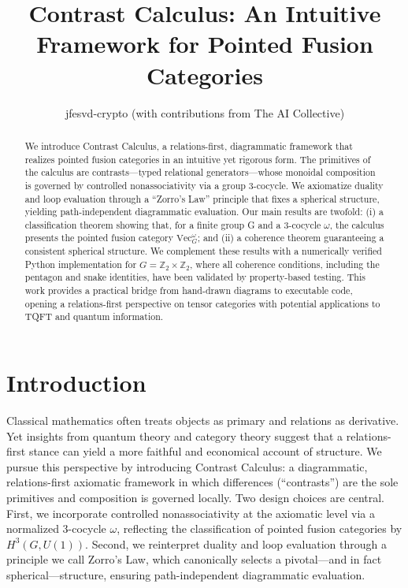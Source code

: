 \documentclass[11pt]{article}
\title{Contrast Calculus: An Intuitive Framework for Pointed Fusion Categories}
\author{jfesvd-crypto (with contributions from The AI Collective)}
\date{}
\theoremstyle{definition}
\theoremstyle{remark}
\begin{document}
\maketitle

\begin{abstract}
We introduce Contrast Calculus, a relations-first, diagrammatic framework that realizes pointed fusion categories in an intuitive yet rigorous form. The primitives of the calculus are contrasts—typed relational generators—whose monoidal composition is governed by controlled nonassociativity via a group 3-cocycle. We axiomatize duality and loop evaluation through a “Zorro’s Law” principle that fixes a spherical structure, yielding path-independent diagrammatic evaluation. Our main results are twofold: (i) a classification theorem showing that, for a finite group G and a 3-cocycle $\omega$, the calculus presents the pointed fusion category $\mathrm{Vec}_G^\omega$; and (ii) a coherence theorem guaranteeing a consistent spherical structure. We complement these results with a numerically verified Python implementation for $G=\mathbb{Z}_2 \times \mathbb{Z}_2$, where all coherence conditions, including the pentagon and snake identities, have been validated by property-based testing. This work provides a practical bridge from hand-drawn diagrams to executable code, opening a relations-first perspective on tensor categories with potential applications to TQFT and quantum information.
\end{abstract}

\section{Introduction}
Classical mathematics often treats objects as primary and relations as derivative. Yet insights from quantum theory and category theory suggest that a relations-first stance can yield a more faithful and economical account of structure. We pursue this perspective by introducing Contrast Calculus: a diagrammatic, relations-first axiomatic framework in which differences (“contrasts”) are the sole primitives and composition is governed locally. Two design choices are central. First, we incorporate controlled nonassociativity at the axiomatic level via a normalized 3-cocycle $\omega$, reflecting the classification of pointed fusion categories by $H^3(G, U(1))$. Second, we reinterpret duality and loop evaluation through a principle we call Zorro’s Law, which canonically selects a pivotal—and in fact spherical—structure, ensuring path-independent diagrammatic evaluation.
\end{document}
